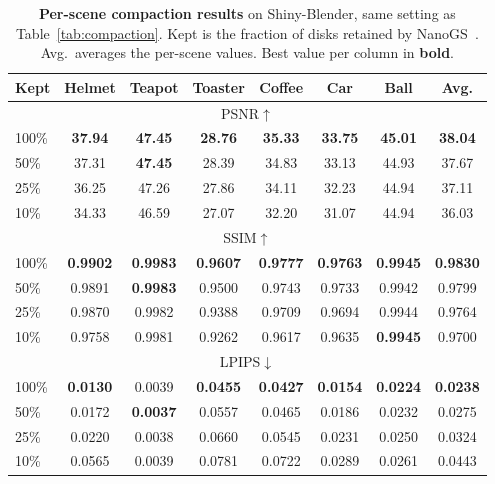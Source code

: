 \begin{table}[t]
\centering
\footnotesize
\setlength{\tabcolsep}{3pt}
\caption{\textbf{Per-scene compaction results} on Shiny-Blender, same setting as
Table~\ref{tab:compaction}. Kept is the fraction of disks retained by NanoGS~\citep{nanogs}.
Avg.\ averages the per-scene values. Best value per column in \textbf{bold}.}
\label{tab:compaction_perscene}
\begin{tabular}{@{}lccccccc@{}}
\toprule
Kept & Helmet & Teapot & Toaster & Coffee & Car & Ball & Avg. \\
\midrule
\multicolumn{8}{c}{PSNR$\uparrow$} \\
\midrule
100\% & \textbf{37.94} & \textbf{47.45} & \textbf{28.76} & \textbf{35.33} & \textbf{33.75} & \textbf{45.01} & \textbf{38.04} \\
50\%  & 37.31 & \textbf{47.45} & 28.39 & 34.83 & 33.13 & 44.93 & 37.67 \\
25\%  & 36.25 & 47.26 & 27.86 & 34.11 & 32.23 & 44.94 & 37.11 \\
10\%  & 34.33 & 46.59 & 27.07 & 32.20 & 31.07 & 44.94 & 36.03 \\
\midrule
\multicolumn{8}{c}{SSIM$\uparrow$} \\
\midrule
100\% & \textbf{0.9902} & \textbf{0.9983} & \textbf{0.9607} & \textbf{0.9777} & \textbf{0.9763} & \textbf{0.9945} & \textbf{0.9830} \\
50\%  & 0.9891 & \textbf{0.9983} & 0.9500 & 0.9743 & 0.9733 & 0.9942 & 0.9799 \\
25\%  & 0.9870 & 0.9982 & 0.9388 & 0.9709 & 0.9694 & 0.9944 & 0.9764 \\
10\%  & 0.9758 & 0.9981 & 0.9262 & 0.9617 & 0.9635 & \textbf{0.9945} & 0.9700 \\
\midrule
\multicolumn{8}{c}{LPIPS$\downarrow$} \\
\midrule
100\% & \textbf{0.0130} & 0.0039 & \textbf{0.0455} & \textbf{0.0427} & \textbf{0.0154} & \textbf{0.0224} & \textbf{0.0238} \\
50\%  & 0.0172 & \textbf{0.0037} & 0.0557 & 0.0465 & 0.0186 & 0.0232 & 0.0275 \\
25\%  & 0.0220 & 0.0038 & 0.0660 & 0.0545 & 0.0231 & 0.0250 & 0.0324 \\
10\%  & 0.0565 & 0.0039 & 0.0781 & 0.0722 & 0.0289 & 0.0261 & 0.0443 \\
\bottomrule
\end{tabular}
\end{table}
